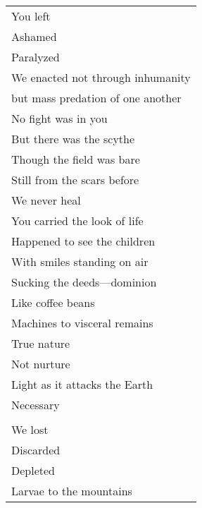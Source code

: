 \documentclass{article}
\begin{document}
\begin{center}
\begin{tabular}{l}
You left \\
Ashamed \\
Paralyzed \\ 
We enacted not through inhumanity \\
but mass predation of one another \\
No fight was in you \\
But there was the scythe \\
Though the field was bare \\
Still from the scars before \\
We never heal \\
You carried the look of life \\
Happened to see the children \\
With smiles standing on air \\
Sucking the deeds---dominion \\
Like coffee beans \\
Machines to visceral remains \\
True nature \\
Not nurture \\
Light as it attacks the Earth \\
Necessary \\
\\
We lost \\
Discarded \\
Depleted \\
Larvae to the mountains \\
\end{tabular}
\end{center}
\end{document}
